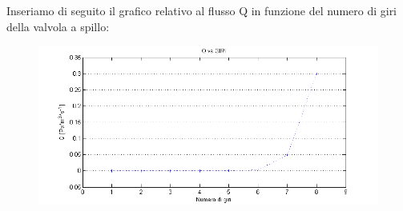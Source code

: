 \documentclass[11pt]{article}
\begin{document}
Inseriamo di seguito il grafico relativo al flusso Q in funzione del numero di giri della valvola a spillo:\\ 
 \begin{center} 
\begin{figure}[H]
\hspace{-90.5pt}
\includegraphics{graficoQ.png}


\end{figure}
\end{center}
\end{document}
